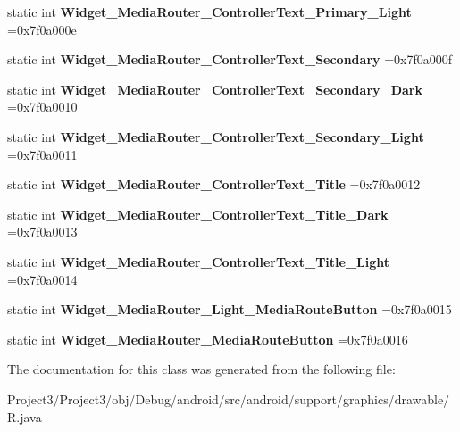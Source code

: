 \begin{DoxyCompactItemize}
static int {\bfseries Widget\+\_\+\+Media\+Router\+\_\+\+Controller\+Text\+\_\+\+Primary\+\_\+\+Light} =0x7f0a000e
\item 
\mbox{\label{classandroid_1_1support_1_1graphics_1_1drawable_1_1R_1_1style_a3d3f10f91a91958aa24c96445029ff30}} 
static int {\bfseries Widget\+\_\+\+Media\+Router\+\_\+\+Controller\+Text\+\_\+\+Secondary} =0x7f0a000f
\item 
\mbox{\label{classandroid_1_1support_1_1graphics_1_1drawable_1_1R_1_1style_abcf0a302fb5ecddb62f1c076c99e7a16}} 
static int {\bfseries Widget\+\_\+\+Media\+Router\+\_\+\+Controller\+Text\+\_\+\+Secondary\+\_\+\+Dark} =0x7f0a0010
\item 
\mbox{\label{classandroid_1_1support_1_1graphics_1_1drawable_1_1R_1_1style_a77bb4f11a54dfd8b33ba19677eae5b6b}} 
static int {\bfseries Widget\+\_\+\+Media\+Router\+\_\+\+Controller\+Text\+\_\+\+Secondary\+\_\+\+Light} =0x7f0a0011
\item 
\mbox{\label{classandroid_1_1support_1_1graphics_1_1drawable_1_1R_1_1style_a95bbc3a585289c2b9f87d448d60720f6}} 
static int {\bfseries Widget\+\_\+\+Media\+Router\+\_\+\+Controller\+Text\+\_\+\+Title} =0x7f0a0012
\item 
\mbox{\label{classandroid_1_1support_1_1graphics_1_1drawable_1_1R_1_1style_a441f2d83bc55928659dc77d7493df879}} 
static int {\bfseries Widget\+\_\+\+Media\+Router\+\_\+\+Controller\+Text\+\_\+\+Title\+\_\+\+Dark} =0x7f0a0013
\item 
\mbox{\label{classandroid_1_1support_1_1graphics_1_1drawable_1_1R_1_1style_a5fd15d31f2bf01aeff7c30f4422ce05c}} 
static int {\bfseries Widget\+\_\+\+Media\+Router\+\_\+\+Controller\+Text\+\_\+\+Title\+\_\+\+Light} =0x7f0a0014
\item 
\mbox{\label{classandroid_1_1support_1_1graphics_1_1drawable_1_1R_1_1style_af153083943c72681fb18d92188e6c31f}} 
static int {\bfseries Widget\+\_\+\+Media\+Router\+\_\+\+Light\+\_\+\+Media\+Route\+Button} =0x7f0a0015
\item 
\mbox{\label{classandroid_1_1support_1_1graphics_1_1drawable_1_1R_1_1style_a21b32b64abe779a4c4422205e20b2d7a}} 
static int {\bfseries Widget\+\_\+\+Media\+Router\+\_\+\+Media\+Route\+Button} =0x7f0a0016
\end{DoxyCompactItemize}


The documentation for this class was generated from the following file\+:\begin{DoxyCompactItemize}
\item 
Project3/\+Project3/obj/\+Debug/android/src/android/support/graphics/drawable/R.\+java\end{DoxyCompactItemize}

